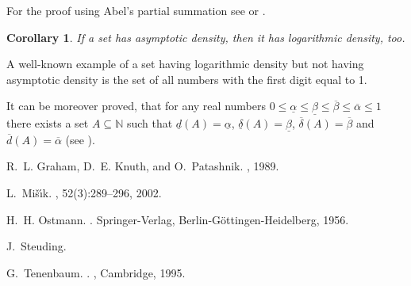 \documentclass[12pt]{article}
\newcommand{\N}[0]{\mathbb{N}}
\newcommand{\ol}[1]{\overline{#1}}
\newcommand{\ul}[1]{\underline{#1}}
\newtheorem{COR}{Corollary}
\begin{document}
For the proof using Abel's partial summation see \cite{steuding}
or \cite{tenenbaum}.

\begin{COR}
If a set has asymptotic density, then it has logarithmic density,
too.
\end{COR}

A well-known example of a set having logarithmic density but not
having asymptotic density is the set of all numbers with the first
digit equal to 1.

It can be moreover proved, that for any real numbers $0\leq\ul
\alpha\leq\ul \beta\leq \ol \beta \leq \ol \alpha \leq 1$ there
exists a set $A\subseteq\N$ such that $\ul d(A)=\ul\alpha$,
$\ul\delta(A)=\ul\beta$, $\ol\delta(A)=\ol\beta$ and $\ol
d(A)=\ol\alpha$ (see \cite{misik}).

\begin{thebibliography}{1}

R.~L. Graham, D.~E. Knuth, and O.~Patashnik.
, 1989.

L.~Mi\v{s}{\'\i}k.
, 52(3):289--296, 2002.

H.~H. Ostmann.
.
\newblock Springer-Verlag, Berlin-G\"ottingen-Heidelberg, 1956.

J.~Steuding.
\newblock {}

G.~Tenenbaum.
.
, Cambridge, 1995.

\end{thebibliography}
\end{document}
